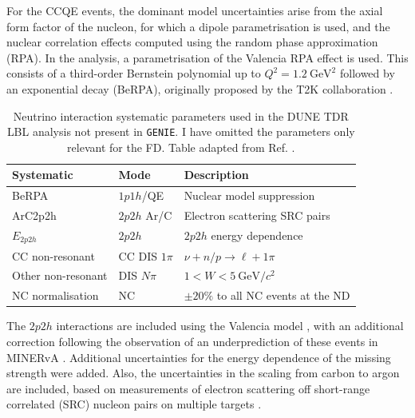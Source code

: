 For the CCQE events, the dominant model uncertainties arise from the axial form factor of the nucleon, for which a dipole parametrisation is used, and the nuclear correlation effects computed using the random phase approximation (RPA). In the analysis, a parametrisation of the Valencia RPA effect \cite{Nieves2011} is used. This consists of a third-order Bernstein polynomial up to $Q^{2} = 1.2 ~ \mathrm{GeV}^{2}$ followed by an exponential decay (BeRPA), originally proposed by the T2K collaboration \cite{T2K2018}.

\begin{table}[t]
	\caption[Neutrino interaction systematic parameters used in the DUNE TDR LBL analysis not present in \texttt{GENIE}.]{Neutrino interaction systematic parameters used in the DUNE TDR LBL analysis not present in \texttt{GENIE}. I have omitted the parameters only relevant for the FD. Table adapted from Ref. \cite{DUNE2021}.}
	\begin{center}
		\begin{small}
			\begin{tabular}{l|l|l}
                Systematic         & Mode        & Description                         \\[2mm] \hline
                \rule{0pt}{1.1\normalbaselineskip}BeRPA              & $1p1h$/QE   & Nuclear model suppression           \\[2mm]
                ArC2p2h            & $2p2h$ Ar/C   & Electron scattering SRC pairs       \\[2mm]
                $E_{2p2h}$         & $2p2h$        & $2p2h$ energy dependence            \\[2mm]
                CC non-resonant    & CC DIS $1\pi$ & $\nu + n/p \rightarrow \ell + 1\pi$ \\[2mm]
                Other non-resonant & DIS $N\pi$    & $1 < W < 5 ~ \mathrm{GeV}/c^{2}$    \\[2mm]
                NC normalisation   & NC            & $\pm 20\%$ to all NC events at the ND
            \end{tabular}
		\end{small}
	\end{center}
	\label{tab:xsec_non_genie_systs}
\end{table}

The $2p2h$ interactions are included using the Valencia model \cite{Nieves2011}, with an additional correction following the observation of an underprediction of these events in MINERvA \cite{MINERvA2015}. Additional uncertainties for the energy dependence of the missing strength were added. Also, the uncertainties in the scaling from carbon to argon are included, based on measurements of electron scattering off short-range correlated (SRC) nucleon pairs on multiple targets \cite{Colle2015}.

